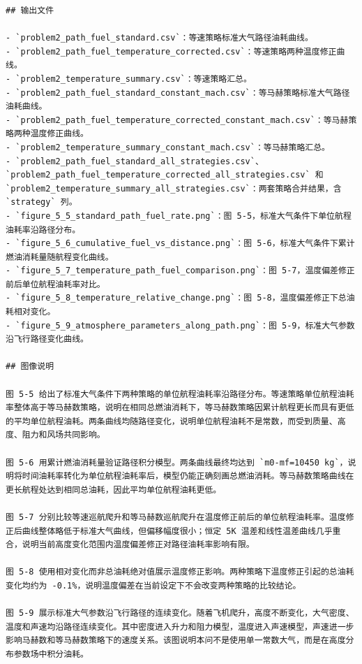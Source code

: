 \documentclass[UTF8]{ctexart}
\begin{document}
\begin{center}
\begin{lstlisting}
## 输出文件

- `problem2_path_fuel_standard.csv`：等速策略标准大气路径油耗曲线。
- `problem2_path_fuel_temperature_corrected.csv`：等速策略两种温度修正曲线。
- `problem2_temperature_summary.csv`：等速策略汇总。
- `problem2_path_fuel_standard_constant_mach.csv`：等马赫策略标准大气路径油耗曲线。
- `problem2_path_fuel_temperature_corrected_constant_mach.csv`：等马赫策略两种温度修正曲线。
- `problem2_temperature_summary_constant_mach.csv`：等马赫策略汇总。
- `problem2_path_fuel_standard_all_strategies.csv`、`problem2_path_fuel_temperature_corrected_all_strategies.csv` 和 `problem2_temperature_summary_all_strategies.csv`：两套策略合并结果，含 `strategy` 列。
- `figure_5_5_standard_path_fuel_rate.png`：图 5-5，标准大气条件下单位航程油耗率沿路径分布。
- `figure_5_6_cumulative_fuel_vs_distance.png`：图 5-6，标准大气条件下累计燃油消耗量随航程变化曲线。
- `figure_5_7_temperature_path_fuel_comparison.png`：图 5-7，温度偏差修正前后单位航程油耗率对比。
- `figure_5_8_temperature_relative_change.png`：图 5-8，温度偏差修正下总油耗相对变化。
- `figure_5_9_atmosphere_parameters_along_path.png`：图 5-9，标准大气参数沿飞行路径变化曲线。

## 图像说明

图 5-5 给出了标准大气条件下两种策略的单位航程油耗率沿路径分布。等速策略单位航程油耗率整体高于等马赫数策略，说明在相同总燃油消耗下，等马赫数策略因累计航程更长而具有更低的平均单位航程油耗。两条曲线均随路径变化，说明单位航程油耗不是常数，而受到质量、高度、阻力和风场共同影响。

图 5-6 用累计燃油消耗量验证路径积分模型。两条曲线最终均达到 `m0-mf=10450 kg`，说明将时间油耗率转化为单位航程油耗率后，模型仍能正确刻画总燃油消耗。等马赫数策略曲线在更长航程处达到相同总油耗，因此平均单位航程油耗更低。

图 5-7 分别比较等速巡航爬升和等马赫数巡航爬升在温度修正前后的单位航程油耗率。温度修正后曲线整体略低于标准大气曲线，但偏移幅度很小；恒定 5K 温差和线性温差曲线几乎重合，说明当前高度变化范围内温度偏差修正对路径油耗率影响有限。

图 5-8 使用相对变化而非总油耗绝对值展示温度修正影响。两种策略下温度修正引起的总油耗变化均约为 -0.1%，说明温度偏差在当前设定下不会改变两种策略的比较结论。

图 5-9 展示标准大气参数沿飞行路径的连续变化。随着飞机爬升，高度不断变化，大气密度、温度和声速均沿路径连续变化。其中密度进入升力和阻力模型，温度进入声速模型，声速进一步影响马赫数和等马赫数策略下的速度关系。该图说明本问不是使用单一常数大气，而是在高度分布参数场中积分油耗。


\end{lstlisting}
\end{center}
\end{document}
